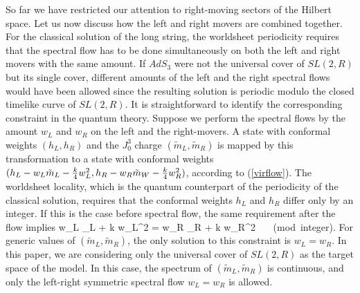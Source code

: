 So far we have restricted our attention to right-moving sectors
of the Hilbert space. Let us now discuss how the left and 
right movers are combined together. For the classical
solution of the long string, the worldsheet periodicity requires
that the spectral flow has to be done simultaneously
on both the left and right movers with the same amount. 
If $AdS_3$ were not the universal cover of $SL(2,R)$
but its single cover, different amounts of the left and
the right spectral flows would have been allowed since
the resulting solution is periodic modulo the closed 
timelike curve of $SL(2,R)$. 
It is straightforward to identify the corresponding constraint
in the quantum theory. 
Suppose we perform the spectral flows by the amount
$w_L$ and $w_R$ on the left and the right-movers. 
A state with conformal weights $(h_L, h_R)$ and
the $J_0^3$ charge $(\tilde{m}_L, \tilde{m}_R)$ is mapped by this
transformation to a state with conformal weights
$(h_L - w_L \tilde{m}_L - {k \over 4} w_L^2, 
h_R - w_R \tilde{m}_W - {k \over 4} w_R^2)$,
according to (\ref{virflow}).  
The worldsheet locality, which is the quantum counterpart
of the periodicity of the classical solution, requires
that the conformal weights $h_L$ and $h_R$ differ only 
by an integer. If this is the case before  spectral
flow, the same requirement after the flow implies
{ w_L _L + {k } w_L^2 = w_R 
_R + {k }
    w_R^2 ~~~({\rm mod~integer}). }
For generic values of $(\tilde{m}_L, \tilde{m}_R)$, 
the only solution to this constraint is $w_L = w_R$.
In this paper, we are considering only the universal
cover of $SL(2,R)$ as the target space of the model.
In this case, the spectrum of $(\tilde{m}_L, \tilde{m}_R)$
is continuous, and only the left-right symmetric spectral
flow $w_L = w_R$ is allowed. 

